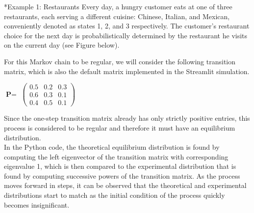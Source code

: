 \documentclass[a4paper, 12pt]{article}
\begin{document}
\begin{tcolorbox}*{Example 1: Restaurants}
	Every day, a hungry customer eats at one of three restaurants, each serving a different cuisine: Chinese, Italian, and Mexican, 		conveniently denoted as states 1, 2, and 3 respectively.
	The customer's restaurant choice for the next day is probabilistically determined by the restaurant he visits on the current day (see Figure below).
\end{tcolorbox}
	\begin{center}
	\end{center}

For this Markov chain to be regular, we will consider the following transition matrix, which is also the default matrix implemented in the Streamlit simulation.

	\begin{center}	
	$\textbf{P}=$
           $\begin{pmatrix}
                0.5 & 0.2 & 0.3 \\
                0.6 & 0.3 & 0.1 \\
                0.4 & 0.5 & 0.1
            \end{pmatrix}$
	\end{center}

Since the one-step transition matrix already has only strictly positive entries, this process is considered to be regular and therefore it must have an equilibrium distribution.\\

In the Python code, the theoretical equilibrium distribution is found by computing the left eigenvector of the transition matrix with corresponding eigenvalue 1, which is then compared to the experimental distribution that is found by computing successive powers of the transition matrix. As the process moves forward in steps, it can be observed that the theoretical and experimental distributions start to match as the initial condition of the process quickly becomes insignificant.
\end{document}
